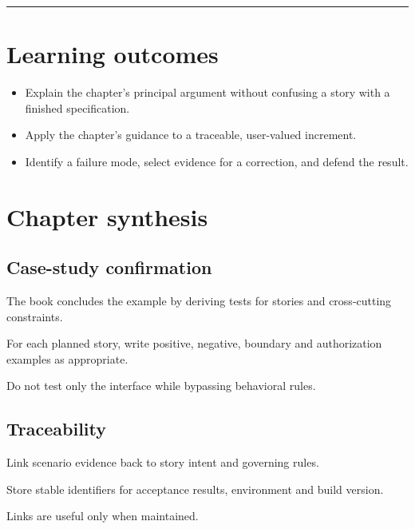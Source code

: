 \documentclass[11pt,letterpaper]{article}
\begin{document}
\tableofcontents\medskip\noindent\rule{\linewidth}{0.4pt}\medskip
\section{Learning outcomes}
\begin{itemize}[leftmargin=*,itemsep=2pt]
\item Explain the chapter's principal argument without confusing a story with a finished specification.
\item Apply the chapter's guidance to a traceable, user-valued increment.
\item Identify a failure mode, select evidence for a correction, and defend the result.
\end{itemize}
\section{Chapter synthesis}
\subsection{Case-study confirmation}
The book concludes the example by deriving tests for stories and cross-cutting constraints.

\begin{tcolorbox}[colback=tealback,colframe=navy,title={Engineering translation},breakable]
For each planned story, write positive, negative, boundary and authorization examples as appropriate.

\end{tcolorbox}
\begin{tcolorbox}[colback=amberback,colframe=navy,title={Failure mode to watch},breakable]
Do not test only the interface while bypassing behavioral rules.

\end{tcolorbox}
\subsection{Traceability}
Link scenario evidence back to story intent and governing rules.

\begin{tcolorbox}[colback=tealback,colframe=navy,title={Engineering translation},breakable]
Store stable identifiers for acceptance results, environment and build version.

\end{tcolorbox}
\begin{tcolorbox}[colback=amberback,colframe=navy,title={Failure mode to watch},breakable]
Links are useful only when maintained.

\end{tcolorbox}
\end{document}
